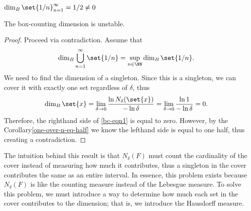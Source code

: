 \begin{corollary}\label{one-over-n-eq-half}
	$\dim_B \set{1/n}_{n=1}^\infty=1/2\neq 0$
\end{corollary}
\begin{corollary}
	The box-counting dimension is unstable.
\end{corollary}
\begin{proof}
	Proceed via contradiction.
	Assume that
	\begin{equation}\label{bc-eqn1}
		\dim_B \bigcup_{n=1}^\infty \set{1/n} = \sup_{n\in\NN} \dim_B \set{1/n}.
	\end{equation}
	We need to find the dimension of a singleton.
	Since this is a singleton, we can cover it with exactly one set regardless of $\delta$, thus
	\[
		\dim_B \set{x} =\lim_{\delta \rightarrow 0} \frac{\ln N_\delta(\set{x})}{-\ln \delta}=\lim_{\delta \rightarrow 0} \frac{\ln 1}{-\ln \delta}=0.
	\]
	Therefore, the righthand side of \autoref{bc-eqn1} is equal to zero.
	However, by the Corollary\autoref{one-over-n-eq-half} we know the lefthand side is equal to one half, thus creating a contradiction.
\end{proof}

The intuition behind this result is that $N_\delta(F)$ must count the cardinality of the cover instead of measuring how much it contributes, thus a singleton in the cover contributes the same as an entire interval.
In essence, this problem exists because $N_\delta(F)$ is like the counting measure instead of the Lebesgue measure.
To solve this problem, we must introduce a way to determine how much each set in the cover contributes to the dimension; that is, we introduce the Hausdorff measure.
